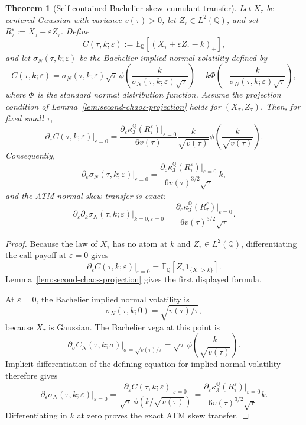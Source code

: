 \documentclass[11pt,a4paper]{amsart}
\theoremstyle{plain}
\newtheorem{theorem}{Theorem}[section]
\theoremstyle{definition}
\theoremstyle{remark}
\newcommand{\QQ}{\mathbb{Q}}
\newcommand{\EE}{\mathbb{E}}
\newcommand{\one}{\mathbf{1}}
\begin{document}
\begin{theorem}[Self-contained Bachelier skew--cumulant transfer]\label{thm:self-contained-bachelier}
Let \(X_\tau\) be centered Gaussian with variance \(v(\tau)>0\), let \(Z_\tau\in L^2(\QQ)\), and
set \(R_\tau^\varepsilon:=X_\tau+\varepsilon Z_\tau\).  Define
\[
        C(\tau,k;\varepsilon):=\EE_\QQ[(X_\tau+\varepsilon Z_\tau-k)_+],
\]
and let \(\sigma_N(\tau,k;\varepsilon)\) be the Bachelier implied normal volatility defined by
\[
        C(\tau,k;\varepsilon)
        =
        \sigma_N(\tau,k;\varepsilon)\sqrt\tau\,
        \phi\!\left(\frac{k}{\sigma_N(\tau,k;\varepsilon)\sqrt\tau}\right)
        -
        k\Phi\!\left(-\frac{k}{\sigma_N(\tau,k;\varepsilon)\sqrt\tau}\right),
\]
where \(\Phi\) is the standard normal distribution function.  Assume the projection condition of
Lemma~\ref{lem:second-chaos-projection} holds for \((X_\tau,Z_\tau)\).  Then, for fixed small
\(\tau\),
\[
        \partial_\varepsilon C(\tau,k;\varepsilon)\big|_{\varepsilon=0}
        =
        \frac{\partial_\varepsilon\kappa_3^\QQ(R_\tau^\varepsilon)|_{\varepsilon=0}}{6v(\tau)}
        \frac{k}{\sqrt{v(\tau)}}
        \phi\!\left(\frac{k}{\sqrt{v(\tau)}}\right).
\]
Consequently,
\[
        \partial_\varepsilon\sigma_N(\tau,k;\varepsilon)\big|_{\varepsilon=0}
        =
        \frac{\partial_\varepsilon\kappa_3^\QQ(R_\tau^\varepsilon)|_{\varepsilon=0}}
        {6v(\tau)^{3/2}\sqrt\tau}\,k,
\]
and the ATM normal skew transfer is exact:
\[
        \partial_\varepsilon\partial_k\sigma_N(\tau,k;\varepsilon)
        \big|_{k=0,\varepsilon=0}
        =
        \frac{\partial_\varepsilon\kappa_3^\QQ(R_\tau^\varepsilon)|_{\varepsilon=0}}
        {6v(\tau)^{3/2}\sqrt\tau}.
\]
\end{theorem}

\begin{proof}
Because the law of \(X_\tau\) has no atom at \(k\) and \(Z_\tau\in L^2(\QQ)\), differentiating the
call payoff at \(\varepsilon=0\) gives
\[
        \partial_\varepsilon C(\tau,k;\varepsilon)|_{\varepsilon=0}
        =
        \EE_\QQ[Z_\tau\one_{\{X_\tau>k\}}].
\]
Lemma~\ref{lem:second-chaos-projection} gives the first displayed formula.

At \(\varepsilon=0\), the Bachelier implied normal volatility is
\[
        \sigma_N(\tau,k;0)=\sqrt{v(\tau)/\tau},
\]
because \(X_\tau\) is Gaussian.  The Bachelier vega at this point is
\[
        \partial_\sigma C_N(\tau,k;\sigma)|_{\sigma=\sqrt{v(\tau)/\tau}}
        =
        \sqrt\tau\,\phi\!\left(\frac{k}{\sqrt{v(\tau)}}\right).
\]
Implicit differentiation of the defining equation for implied normal volatility therefore gives
\[
        \partial_\varepsilon\sigma_N(\tau,k;\varepsilon)|_{\varepsilon=0}
        =
        \frac{\partial_\varepsilon C(\tau,k;\varepsilon)|_{\varepsilon=0}}
        {\sqrt\tau\,\phi(k/\sqrt{v(\tau)})}
        =
        \frac{\partial_\varepsilon\kappa_3^\QQ(R_\tau^\varepsilon)|_{\varepsilon=0}}
        {6v(\tau)^{3/2}\sqrt\tau}k .
\]
Differentiating in \(k\) at zero proves the exact ATM skew transfer.
\end{proof}
\end{document}

